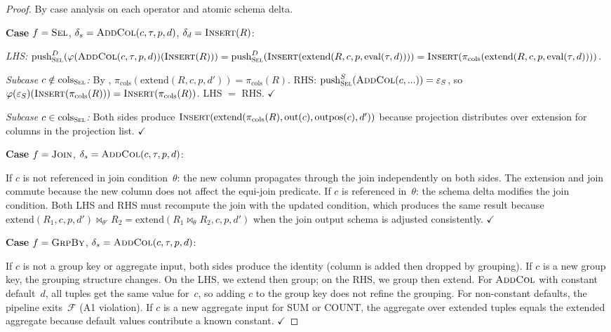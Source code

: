 \documentclass[11pt,a4paper]{article}
\theoremstyle{definition}
\newcommand{\epsS}{\varepsilon_S}
\newcommand{\push}{\mathrm{push}}
\newcommand{\FragF}{\mathcal{F}}
\begin{document}
\begin{proof}
By case analysis on each operator and atomic schema delta.

\textbf{Case} $f = \textsc{Sel}$, $\delta_s = \textsc{AddCol}(c, \tau, p, d)$,
$\delta_d = \textsc{Insert}(R)$:

\emph{LHS:}
$\push_{\textsc{Sel}}^D(\varphi(\textsc{AddCol}(c,\tau,p,d))(\textsc{Insert}(R)))
= \push_{\textsc{Sel}}^D(\textsc{Insert}(\mathrm{extend}(R, c, p, \mathrm{eval}(\tau,d))))
= \textsc{Insert}(\pi_{\mathrm{cols}}(\mathrm{extend}(R, c, p, \mathrm{eval}(\tau,d))))$.

\emph{Subcase $c \notin \mathrm{cols}_{\textsc{Sel}}$:}
By ,
$\pi_{\mathrm{cols}}(\mathrm{extend}(R,c,p,d')) = \pi_{\mathrm{cols}}(R)$.
RHS: $\push_{\textsc{Sel}}^S(\textsc{AddCol}(c,...)) = \epsS$, so
$\varphi(\epsS)(\textsc{Insert}(\pi_{\mathrm{cols}}(R)))
= \textsc{Insert}(\pi_{\mathrm{cols}}(R))$. LHS $=$ RHS. $\checkmark$

\emph{Subcase $c \in \mathrm{cols}_{\textsc{Sel}}$:}
Both sides produce
$\textsc{Insert}(\mathrm{extend}(\pi_{\mathrm{cols}}(R), \mathrm{out}(c),
\mathrm{outpos}(c), d'))$
because projection distributes over extension for columns in the projection
list. $\checkmark$

\textbf{Case} $f = \textsc{Join}$, $\delta_s = \textsc{AddCol}(c, \tau, p, d)$:

If $c$ is not referenced in join condition~$\theta$: the new column propagates
through the join independently on both sides.  The extension and join commute
because the new column does not affect the equi-join predicate.
If $c$ is referenced in~$\theta$: the schema delta modifies the join condition.
Both LHS and RHS must recompute the join with the updated condition, which
produces the same result because $\mathrm{extend}(R_1, c, p, d') \bowtie_{\theta'}
R_2 = \mathrm{extend}(R_1 \bowtie_\theta R_2, c, p, d')$ when the join output
schema is adjusted consistently. $\checkmark$

\textbf{Case} $f = \textsc{GrpBy}$, $\delta_s = \textsc{AddCol}(c, \tau, p, d)$:

If $c$ is not a group key or aggregate input, both sides produce the identity
(column is added then dropped by grouping).
If $c$ is a new group key, the grouping structure changes.  On the LHS,
we extend then group; on the RHS, we group then extend.  For
$\textsc{AddCol}$ with constant default~$d$, all tuples get the same value
for~$c$, so adding $c$ to the group key does not refine the grouping.
For non-constant defaults, the pipeline exits~$\FragF$ (A1 violation).
If $c$ is a new aggregate input for SUM or COUNT, the aggregate over extended
tuples equals the extended aggregate because default values contribute
a known constant. $\checkmark$


\end{proof}
\end{document}
